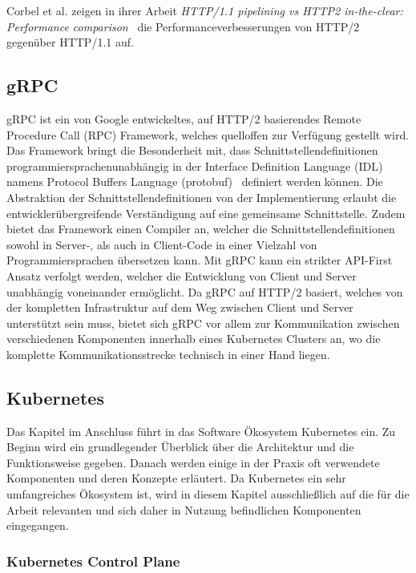 Corbel et al. zeigen in ihrer Arbeit \textit{HTTP/1.1 pipelining vs HTTP2 in-the-clear: Performance comparison}~\cite{7745823} die Performanceverbesserungen von HTTP/2 gegenüber HTTP/1.1 auf.

\subsection{gRPC}\label{subsec:grpc}
gRPC ist ein von Google entwickeltes, auf HTTP/2 basierendes Remote Procedure Call (RPC) Framework, welches quelloffen zur Verfügung gestellt wird.
Das Framework bringt die Besonderheit mit, dass Schnittstellendefinitionen programmiersprachenunabhängig in der Interface Definition Language (IDL) namens Protocol Buffers Language (protobuf)~\cite{protobuf} definiert werden können.
Die Abstraktion der Schnittstellendefinitionen von der Implementierung erlaubt die entwicklerübergreifende Verständigung auf eine gemeinsame Schnittstelle.
Zudem bietet das Framework einen Compiler an, welcher die Schnittstellendefinitionen sowohl in Server-, als auch in Client-Code in einer Vielzahl von Programmiersprachen übersetzen kann.
Mit gRPC kann ein strikter API-First Ansatz verfolgt werden, welcher die Entwicklung von Client und Server unabhängig voneinander ermöglicht.
Da gRPC auf HTTP/2 basiert, welches von der kompletten Infrastruktur auf dem Weg zwischen Client und Server unterstützt sein muss, bietet sich gRPC vor allem zur Kommunikation zwischen verschiedenen Komponenten innerhalb eines Kubernetes Clusters an, wo die komplette Kommunikationsstrecke technisch in einer Hand liegen.

\subsection{Kubernetes}\label{subsec:kubernetes}
Das Kapitel im Anschluss führt in das Software Ökosystem Kubernetes ein.
Zu Beginn wird ein grundlegender Überblick über die Architektur und die Funktionsweise gegeben.
Danach werden einige in der Praxis oft verwendete Komponenten und deren Konzepte erläutert.
Da Kubernetes ein sehr umfangreiches Ökosystem ist, wird in diesem Kapitel ausschließlich auf die für die Arbeit relevanten und sich daher in Nutzung befindlichen Komponenten eingegangen.

\subsubsection{Kubernetes Control Plane}

